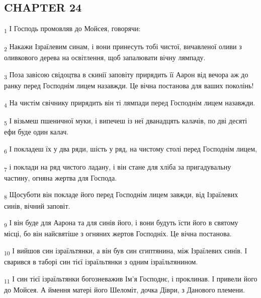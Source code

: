 \subsection{CHAPTER 24}
\begin{tcolorbox}
\textsubscript{1} І Господь промовляв до Мойсея, говорячи:
\end{tcolorbox}
\begin{tcolorbox}
\textsubscript{2} Накажи Ізраїлевим синам, і вони принесуть тобі чистої, вичавленої оливи з оливкового дерева на освітлення, щоб запалювати вічну лямпаду.
\end{tcolorbox}
\begin{tcolorbox}
\textsubscript{3} Поза завісою свідоцтва в скинії заповіту прирядить її Аарон від вечора аж до ранку перед Господнім лицем назавжди. Це вічна постанова для ваших поколінь!
\end{tcolorbox}
\begin{tcolorbox}
\textsubscript{4} На чистім свічнику прирядить він ті лямпади перед Господнім лицем назавжди.
\end{tcolorbox}
\begin{tcolorbox}
\textsubscript{5} І візьмеш пшеничної муки, і випечеш із неї дванадцять калачів, по дві десяті ефи буде один калач.
\end{tcolorbox}
\begin{tcolorbox}
\textsubscript{6} І покладеш їх у два ряди, шість у ряд, на чистому столі перед Господнім лицем,
\end{tcolorbox}
\begin{tcolorbox}
\textsubscript{7} і поклади на ряд чистого ладану, і він стане для хліба за пригадувальну частину, огняна жертва для Господа.
\end{tcolorbox}
\begin{tcolorbox}
\textsubscript{8} Щосуботи він покладе його перед Господнім лицем завжди, від Ізраїлевих синів, вічний заповіт.
\end{tcolorbox}
\begin{tcolorbox}
\textsubscript{9} І він буде для Аарона та для синів його, і вони будуть їсти його в святому місці, бо він найсвятіше з огняних жертов Господніх. Це вічна постанова.
\end{tcolorbox}
\begin{tcolorbox}
\textsubscript{10} І вийшов син ізраїльтянки, а він був син єгиптянина, між Ізраїлевих синів. І сварився в таборі син тієї ізраїльтянки з одним ізраїльтянином.
\end{tcolorbox}
\begin{tcolorbox}
\textsubscript{11} І син тієї ізраїльтянки богозневажив Ім'я Господнє, і проклинав. І привели його до Мойсея. А ймення матері його Шеломіт, дочка Діври, з Данового племени.
\end{tcolorbox}
